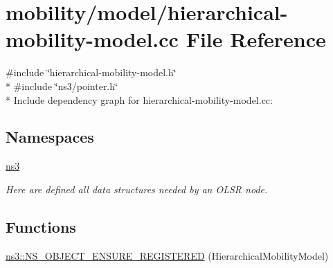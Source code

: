 \hypertarget{hierarchical-mobility-model_8cc}{}\section{mobility/model/hierarchical-\/mobility-\/model.cc File Reference}
\label{hierarchical-mobility-model_8cc}
{\ttfamily \#include \char`\"{}hierarchical-\/mobility-\/model.\+h\char`\"{}}\\*
{\ttfamily \#include \char`\"{}ns3/pointer.\+h\char`\"{}}\\*
Include dependency graph for hierarchical-\/mobility-\/model.cc\+:
\subsection*{Namespaces}
\begin{DoxyCompactItemize}
\item 
 \hyperlink{namespacens3}{ns3}
\begin{DoxyCompactList}\small\item\em Here are defined all data structures needed by an O\+L\+SR node. \end{DoxyCompactList}\end{DoxyCompactItemize}
\subsection*{Functions}
\begin{DoxyCompactItemize}
\item 
\hyperlink{namespacens3_a0d708e96e9920a9c83fa222f8b421967}{ns3\+::\+N\+S\+\_\+\+O\+B\+J\+E\+C\+T\+\_\+\+E\+N\+S\+U\+R\+E\+\_\+\+R\+E\+G\+I\+S\+T\+E\+R\+ED} (Hierarchical\+Mobility\+Model)
\end{DoxyCompactItemize}
